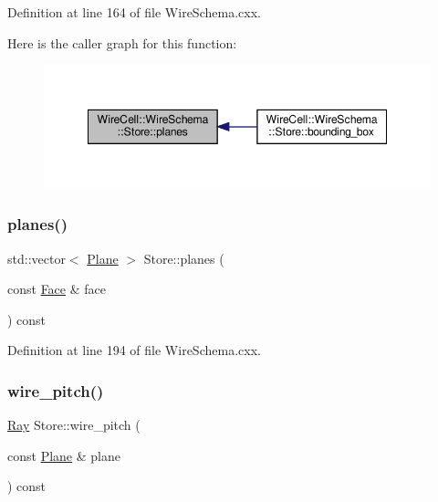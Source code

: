 Definition at line 164 of file Wire\+Schema.\+cxx.

Here is the caller graph for this function\+:
\nopagebreak
\begin{figure}[H]
\begin{center}
\leavevmode
\includegraphics[width=348pt]{class_wire_cell_1_1_wire_schema_1_1_store_aaedfc8ae05d2fe0ef02da6e9d8e8eca1_icgraph}
\end{center}
\end{figure}
\mbox{\label{class_wire_cell_1_1_wire_schema_1_1_store_aefcc67db968fb4fe44e5cf610704f482}} 
\subsubsection{\texorpdfstring{planes()}{planes()}\hspace{0.1cm}{\footnotesize\ttfamily [2/2]}}
{\footnotesize\ttfamily std\+::vector$<$ \hyperlink{struct_wire_cell_1_1_wire_schema_1_1_plane}{Plane} $>$ Store\+::planes (\begin{DoxyParamCaption}\item[{const \hyperlink{struct_wire_cell_1_1_wire_schema_1_1_face}{Face} \&}]{face }\end{DoxyParamCaption}) const}



Definition at line 194 of file Wire\+Schema.\+cxx.

\mbox{\label{class_wire_cell_1_1_wire_schema_1_1_store_abc4cbd21498604e65dbb8753a437a2c2}} 
\subsubsection{\texorpdfstring{wire\+\_\+pitch()}{wire\_pitch()}}
{\footnotesize\ttfamily \hyperlink{namespace_wire_cell_a3ab20d9b438feb7eb1ffaab9ba98af0c}{Ray} Store\+::wire\+\_\+pitch (\begin{DoxyParamCaption}\item[{const \hyperlink{struct_wire_cell_1_1_wire_schema_1_1_plane}{Plane} \&}]{plane }\end{DoxyParamCaption}) const}



